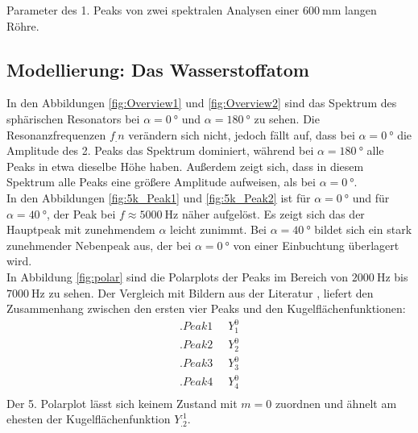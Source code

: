 \begin{table}
\caption{Parameter des 1. Peaks von zwei spektralen Analysen einer $\SI{600}{\milli\meter}$ langen Röhre.}
\centering

\label{tab:param}
\end{table}

\subsection{Modellierung: Das Wasserstoffatom}

In den Abbildungen \ref{fig:Overview1} und \ref{fig:Overview2} sind das Spektrum des sphärischen Resonators bei $\alpha=\SI{0}{\degree}$ und $\alpha=\SI{180}{\degree}$
zu sehen.
Die Resonanzfrequenzen $f_.n$ verändern sich nicht, jedoch fällt auf, dass bei $\alpha=\SI{0}{\degree}$ die Amplitude des 2. Peaks das Spektrum dominiert, während bei $\alpha=\SI{180}{\degree}$ alle Peaks in etwa dieselbe Höhe haben. Außerdem zeigt sich, dass in diesem Spektrum alle Peaks eine größere Amplitude aufweisen, als bei $\alpha=\SI{0}{\degree}$.\\
In den Abbildungen \ref{fig:5k_Peak1} und \ref{fig:5k_Peak2} ist für $\alpha=\SI{0}{\degree}$ und für $\alpha=\SI{40}{\degree}$, der Peak bei $f\approx\SI{5000}{\hertz}$ näher aufgelöst.
Es zeigt sich das der Hauptpeak mit zunehmendem $\alpha$ leicht zunimmt. Bei $\alpha=\SI{40}{\degree}$ bildet sich ein stark zunehmender Nebenpeak aus, der bei $\alpha=\SI{0}{\degree}$ von einer Einbuchtung überlagert wird.\\
In Abbildung \ref{fig:polar} sind die Polarplots der Peaks im Bereich von $\SI{2000}{\hertz}$ bis $\SI{7000}{\hertz}$ zu sehen.
Der Vergleich mit Bildern aus der Literatur \cite{V23}, liefert den Zusammenhang zwischen den ersten vier Peaks und den Kugelflächenfunktionen:
\begin{align*}
.{Peak 1}&\mathop{\widehat{=}} Y^0_1\\
.{Peak 2}&\mathop{\widehat{=}} Y^0_2\\
.{Peak 3}&\mathop{\widehat{=}} Y^0_3\\
.{Peak 4}&\mathop{\widehat{=}} Y^0_4\\
\end{align*}
Der 5. Polarplot lässt sich keinem Zustand mit $m=0$ zuordnen und ähnelt am ehesten der Kugelflächenfunktion $Y^.1_.2$.

